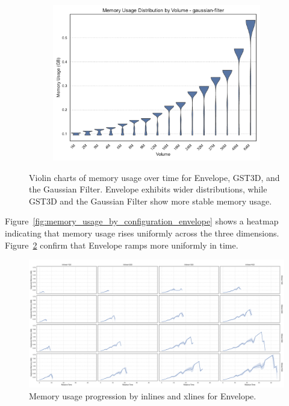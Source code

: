 \begin{figure}[htbp]
\begin{subfigure}[t]{0.49\textwidth}
        \includegraphics[width=\textwidth]{assets/images/05/memory_usage_distribution_gaussian-filter}
    \end{subfigure}
    \caption{Violin charts of memory usage over time for Envelope, \ac{GST3D}, and the Gaussian Filter.
    Envelope exhibits wider distributions, while \ac{GST3D} and the Gaussian Filter show more stable memory usage.}
    \label{fig:memory_usage_distribution}
\end{figure}

Figure~\ref{fig:memory_usage_by_configuration_envelope} shows a heatmap indicating that memory usage rises uniformly across the three dimensions.
Figure~\ref{fig:inline_xline_memory_usage_progression_envelope} confirm that Envelope ramps more uniformly in time.

\begin{figure}[htbp]
    \centering
    \includegraphics[width=\textwidth]{assets/images/05/inline_xline_memory_usage_progression_envelope}
    \caption{Memory usage progression by inlines and xlines for Envelope.}
    \label{fig:inline_xline_memory_usage_progression_envelope}
\end{figure}

